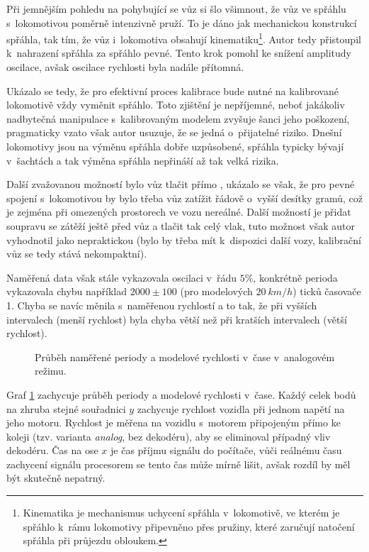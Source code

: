 Při jemnějším pohledu na pohybující se vůz si šlo všimnout, že vůz ve spřáhlu
s~lokomotivou poměrně intenzivně pruží. To je dáno jak mechanickou konstrukcí
spřáhla, tak tím, že vůz i~lokomotiva obsahují kinematiku\footnote{Kinematika
je mechanismus uchycení spřáhla v~lokomotivě, ve kterém je spřáhlo k~rámu
lokomotivy připevněno přes pružiny, které zaručují natočení spřáhla při
průjezdu obloukem.}.
Autor tedy přistoupil k~nahrazení spřáhla za spřáhlo pevné. Tento krok pomohl
ke snížení amplitudy oscilace, avšak oscilace rychlosti byla nadále přítomná.

Ukázalo se tedy, že pro efektivní proces kalibrace bude nutné na kalibrované
lokomotivě vždy vyměnit spřáhlo. Toto zjištění je nepříjemné, neboť
jakákoliv nadbytečná manipulace s~kalibrovaným modelem zvyšuje šanci jeho
poškození, pragmaticky vzato však autor usuzuje, že se jedná o~přijatelné
riziko. Dnešní lokomotivy jsou na výměnu spřáhla dobře uzpůsobené, spřáhla
typicky bývají v~šachtách a tak výměna spřáhla nepřináší až tak velká rizika.

Další zvažovanou možností bylo vůz tlačit přímo ,
ukázalo se však, že pro pevné spojení s~lokomotivou by bylo třeba vůz zatížit
řádově o~vyšší desítky gramů, což je zejména při omezených prostorech ve vozu
nereálné. Další možností je přidat soupravu se zátěží ještě před vůz a tlačit
tak celý vlak, tuto možnost však autor vyhodnotil jako nepraktickou (bylo by
třeba mít k~dispozici další vozy, kalibrační vůz se tedy stává nekompaktní).

Naměřená data však stále vykazovala oscilaci v~řádu $5 \%$, konkrétně perioda
vykazovala chybu například $2000 \pm 100$ (pro modelových $20\ km/h$) ticků
časovače 1. Chyba se navíc měnila s~naměřenou rychlostí a to tak, že při
vyšších intervalech (menší rychlost) byla chyba větší než při kratších
intervalech (větší rychlost).

\begin{figure}[h]

\caption{Průběh naměřené periody a modelové rychlosti v~čase v~analogovém
režimu.}
\label{fig:speed-analog}
\end{figure}

Graf \ref{fig:speed-analog} zachycuje průběh periody a modelové rychlosti
v~čase. Každý celek bodů na zhruba stejné souřadnici $y$ zachycuje rychlost
vozidla při jednom napětí na jeho motoru. Rychlost je měřena na vozidlu
s~motorem připojeným přímo ke koleji (tzv. varianta \textit{analog}, bez
dekodéru), aby se eliminoval případný vliv dekodéru. Čas na ose $x$ je čas
příjmu signálu do počítače, vůči reálnému času zachycení signálu procesorem se
tento čas může mírně lišit, avšak rozdíl by měl být skutečně nepatrný.

